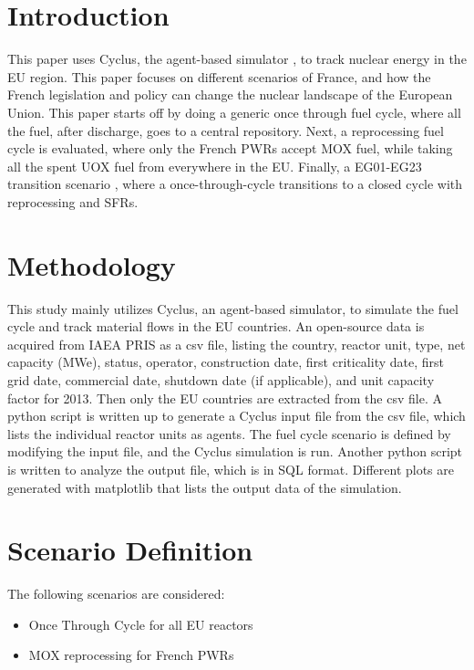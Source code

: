 \section{Introduction}
This paper uses Cyclus, the agent-based simulator \cite{huff_fundamental_2016}, to track
nuclear energy in the EU region. This paper focuses on different scenarios of France,
and how the French legislation and policy can change the nuclear landscape of the European
Union. This paper starts off by doing a generic once through fuel cycle, where all the fuel,
after discharge, goes to a central repository. Next, a reprocessing fuel cycle is evaluated,
where only the French \gls{PWR}s accept \gls{MOX} fuel, while taking all the spent \gls{UOX}
fuel from everywhere in the EU. Finally, a EG01-EG23 transition scenario \cite{wigeland_nuclear_2014},
where a once-through-cycle transitions to a closed cycle with reprocessing and \gls{SFR}s. 

\section{Methodology}
This study mainly utilizes Cyclus, an agent-based simulator, to simulate the fuel cycle
and track material flows in the EU countries. An open-source data is acquired from \gls{IAEA}
\gls{PRIS} as a csv file, listing the country, reactor unit, type, net capacity (MWe), status,
operator, construction date, first criticality date, first grid date, commercial date, shutdown
date (if applicable), and unit capacity factor for 2013. Then only the EU countries are extracted
from the csv file. A python script is written up to generate a Cyclus input file from the csv file,
which lists the individual reactor units as agents. The fuel cycle scenario is defined by modifying
the input file, and the Cyclus simulation is run. Another python script is written to analyze the 
output file, which is in SQL format. Different plots are generated with matplotlib that lists the
output data of the simulation.

\section{Scenario Definition}
The following scenarios are considered: 
\begin{itemize}
	\item Once Through Cycle for all EU reactors
	\item \gls{MOX} reprocessing for French \gls{PWR}s
\end{itemize}
